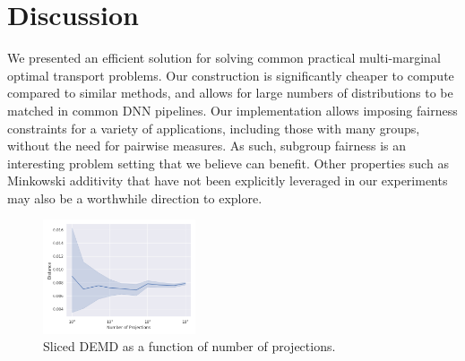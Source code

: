 \section{Discussion}
We presented an efficient solution for solving common practical multi-marginal optimal transport problems.
Our construction is significantly cheaper to compute compared to similar methods,
and allows for large numbers of distributions to be matched in common DNN pipelines. 
Our implementation allows imposing fairness constraints for a variety of applications, including those with many groups, without the need for pairwise measures.
As such, subgroup fairness \citep{kearns2018preventing} is an interesting problem setting that we believe can benefit.
Other properties such as 
Minkowski additivity that have not been 
explicitly leveraged in our experiments may also be a worthwhile direction to explore.
\begin{figure}
    \centering
    \includegraphics[width=0.4\textwidth]{6_demd/figs/sliced/demd_multidim_proj_convergence_CelebA.png}
    \caption{Sliced DEMD as a function of number of projections.}
    \label{fig:sliced}
\end{figure}


